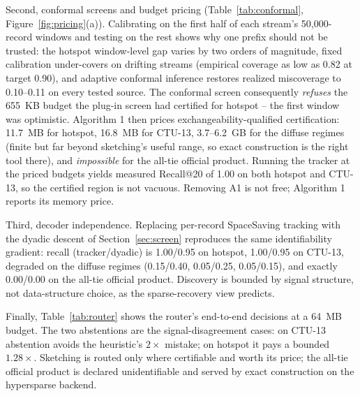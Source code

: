 \documentclass[conference]{IEEEtran}
\begin{document}
Second, conformal screens and budget pricing (Table~\ref{tab:conformal}, Figure~\ref{fig:pricing}(a)). Calibrating on the first half of each stream's 50{,}000-record windows and testing on the rest shows why one prefix should not be trusted: the hotspot window-level gap varies by two orders of magnitude, fixed calibration under-covers on drifting streams (empirical coverage as low as 0.82 at target 0.90), and adaptive conformal inference restores realized miscoverage to 0.10--0.11 on every tested source. The conformal screen consequently \emph{refuses} the 655~KB budget the plug-in screen had certified for hotspot -- the first window was optimistic. Algorithm 1 then prices exchangeability-qualified certification: 11.7~MB for hotspot, 16.8~MB for CTU-13, 3.7--6.2~GB for the diffuse regimes (finite but far beyond sketching's useful range, so exact construction is the right tool there), and \emph{impossible} for the all-tie official product. Running the tracker at the priced budgets yields measured Recall@20 of 1.00 on both hotspot and CTU-13, so the certified region is not vacuous. Removing A1 is not free; Algorithm 1 reports its memory price.

Third, decoder independence. Replacing per-record SpaceSaving tracking with the dyadic descent of Section~\ref{sec:screen} reproduces the same identifiability gradient: recall (tracker/dyadic) is 1.00/0.95 on hotspot, 1.00/0.95 on CTU-13, degraded on the diffuse regimes (0.15/0.40, 0.05/0.25, 0.05/0.15), and exactly 0.00/0.00 on the all-tie official product. Discovery is bounded by signal structure, not data-structure choice, as the sparse-recovery view predicts.

Finally, Table~\ref{tab:router} shows the router's end-to-end decisions at a 64~MB budget. The two abstentions are the signal-disagreement cases: on CTU-13 abstention avoids the heuristic's $2\times$ mistake; on hotspot it pays a bounded $1.28\times$. Sketching is routed only where certifiable and worth its price; the all-tie official product is declared unidentifiable and served by exact construction on the hypersparse backend.
\end{document}
